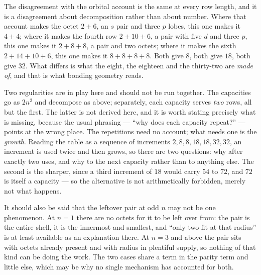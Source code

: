 \documentclass[11pt]{article}
\begin{document}
The disagreement with the orbital account is the same at every row length, and it is a
disagreement about decomposition rather than about number. Where that account makes the octet
$2{+}6$, an $s$ pair and three $p$ lobes, this one makes it $4{+}4$; where it makes the fourth
row $2{+}10{+}6$, a pair with five $d$ and three $p$, this one makes it $2{+}8{+}8$, a pair and
two octets; where it makes the sixth $2{+}14{+}10{+}6$, this one makes it $8{+}8{+}8{+}8$. Both
give $8$, both give $18$, both give $32$. What differs is what the eight, the eighteen and the
thirty-two are \emph{made of}, and that is what bonding geometry reads.

Two regularities are in play here and should not be run together. The capacities go as $2n^2$
and decompose as above; separately, each capacity serves \emph{two} rows, all but the first.
The latter is not derived here, and it is worth stating precisely what is missing, because the
usual phrasing --- ``why does each capacity repeat?'' --- points at the wrong place. The
repetitions need no account; what needs one is the \emph{growth}. Reading the table as a sequence
of increments $2,8,8,18,18,32,32$, an increment is used twice and then grows, so there are two
questions: why after exactly two uses, and why to the next capacity rather
than to anything else. The second is the sharper, since a third increment of $18$ would carry
$54$ to $72$, and $72$ is itself a capacity --- so the alternative is not arithmetically
forbidden, merely not what happens.

It should also be said that the leftover pair at odd $n$ may not be one phenomenon. At $n=1$
there are no octets for it to be left over from: the pair is the entire shell, it is the
innermost and smallest, and ``only two fit at that radius'' is at least available as an
explanation there. At $n=3$ and above the pair sits with octets already present and with radius
in plentiful supply, so nothing of that kind can be doing the work. The two cases share a term in
the parity term and little else, which may be why no single mechanism has accounted for both.
\end{document}

